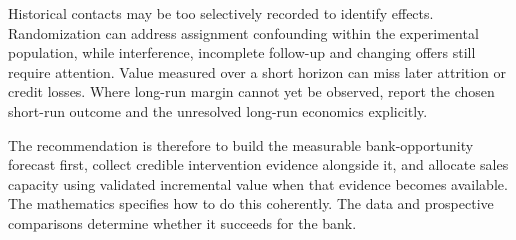 Historical contacts may be too selectively recorded to identify effects. Randomization can address assignment confounding within the experimental population, while interference, incomplete follow-up and changing offers still require attention. Value measured over a short horizon can miss later attrition or credit losses. Where long-run margin cannot yet be observed, report the chosen short-run outcome and the unresolved long-run economics explicitly.

The recommendation is therefore to build the measurable bank-opportunity forecast first, collect credible intervention evidence alongside it, and allocate sales capacity using validated incremental value when that evidence becomes available. The mathematics specifies how to do this coherently. The data and prospective comparisons determine whether it succeeds for the bank.
